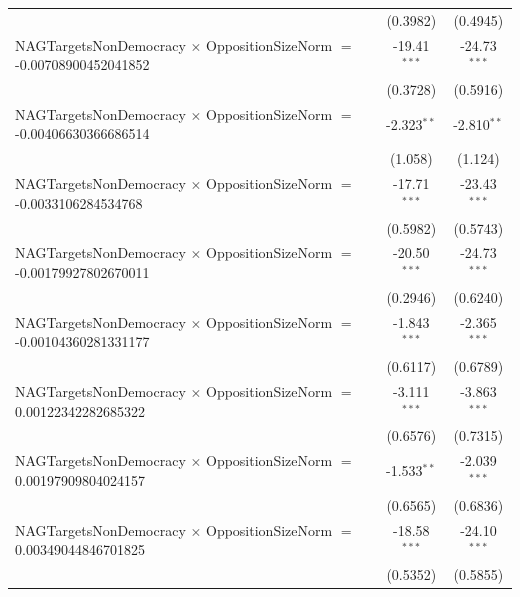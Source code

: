 \begin{tabular}{lcc}
                                                                                & (0.3982)             & (0.4945)\\   
   NAGTargetsNonDemocracy $\times$ OppositionSizeNorm $=$ -0.00708900452041852  & -19.41$^{***}$       & -24.73$^{***}$\\   
                                                                                & (0.3728)             & (0.5916)\\   
   NAGTargetsNonDemocracy $\times$ OppositionSizeNorm $=$ -0.00406630366686514  & -2.323$^{**}$        & -2.810$^{**}$\\   
                                                                                & (1.058)              & (1.124)\\   
   NAGTargetsNonDemocracy $\times$ OppositionSizeNorm $=$ -0.0033106284534768   & -17.71$^{***}$       & -23.43$^{***}$\\   
                                                                                & (0.5982)             & (0.5743)\\   
   NAGTargetsNonDemocracy $\times$ OppositionSizeNorm $=$ -0.00179927802670011  & -20.50$^{***}$       & -24.73$^{***}$\\   
                                                                                & (0.2946)             & (0.6240)\\   
   NAGTargetsNonDemocracy $\times$ OppositionSizeNorm $=$ -0.00104360281331177  & -1.843$^{***}$       & -2.365$^{***}$\\   
                                                                                & (0.6117)             & (0.6789)\\   
   NAGTargetsNonDemocracy $\times$ OppositionSizeNorm $=$ 0.00122342282685322   & -3.111$^{***}$       & -3.863$^{***}$\\   
                                                                                & (0.6576)             & (0.7315)\\   
   NAGTargetsNonDemocracy $\times$ OppositionSizeNorm $=$ 0.00197909804024157   & -1.533$^{**}$        & -2.039$^{***}$\\   
                                                                                & (0.6565)             & (0.6836)\\   
   NAGTargetsNonDemocracy $\times$ OppositionSizeNorm $=$ 0.00349044846701825   & -18.58$^{***}$       & -24.10$^{***}$\\   
                                                                                & (0.5352)             & (0.5855)\\   

\end{tabular}

